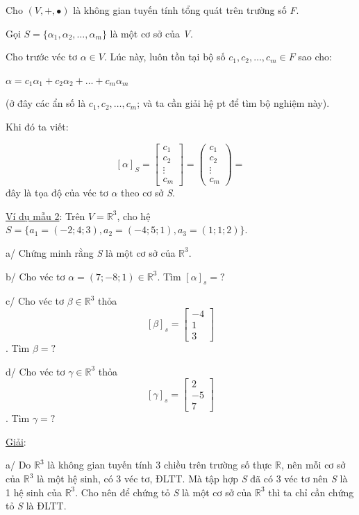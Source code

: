 \documentclass[12pt,a4paper]{article}
\newcommand{\ul}[1]{\uline{#1}}
\begin{document}
Cho $(V, +, \bullet)$ là không gian
tuyến tính tổng quát trên trường số \emph{F}.

Gọi $S = \{ \alpha_1, \alpha_2, \dots, \alpha_m \}$ là một cơ sở của
\emph{V}.

Cho trước véc tơ $\alpha \in V$. Lúc
này, luôn tồn tại bộ số
$c_1, c_2, \dots, c_m \in F$ sao cho:

$\alpha = c_1\alpha_1 + c_2\alpha_2 + \dots + c_m\alpha_m$

(ở đây các ẩn số là $c_1, c_2, \dots, c_m$;
và ta cần giải hệ pt để tìm bộ nghiệm này).

Khi đó ta viết:

\[[\alpha]_S = \begin{bmatrix} c_1 \\ c_2 \\ \vdots \\ c_m \end{bmatrix} = \begin{pmatrix} c_1 \\ c_2 \\ \vdots \\ c_m \end{pmatrix} =\] đây là tọa độ của véc
tơ $\alpha$ theo cơ sở
\emph{S}.

\ul{Ví dụ mẫu 2}: Trên
$V = \mathbb{R}^3$, cho hệ
$S = \{ a_1 = (-2; 4; 3), a_2 = (-4; 5; 1), a_3 = (1; 1; 2) \}$.

a/ Chứng minh rằng \emph{S} là một cơ sở của
$\mathbb{R}^3$.

b/ Cho véc tơ $\alpha = (7; -8; 1) \in \mathbb{R}^3$. Tìm
$[\alpha]_s =?$

c/ Cho véc tơ $\beta \in \mathbb{R}^3$ thỏa
\[[\beta]_s = \begin{bmatrix} -4 \\ 1 \\ 3 \end{bmatrix}\]. Tìm
$\beta =?$

d/ Cho véc tơ $\gamma \in \mathbb{R}^3$ thỏa
\[[\gamma]_s = \begin{bmatrix} 2 \\ -5 \\ 7 \end{bmatrix}\]. Tìm
$\gamma =?$

\ul{Giải}:

a/ Do $\mathbb{R}^3$ là không gian
tuyến tính 3 chiều trên trường số thực
$\mathbb{R}$, nên mỗi cơ sở của
$\mathbb{R}^3$ là một hệ sinh, có 3
véc tơ, ĐLTT. Mà tập hợp \emph{S} đã có 3 véc tơ nên \emph{S} là 1 hệ
sinh của $\mathbb{R}^3$. Cho nên để
chứng tỏ \emph{S} là một cơ sở của
$\mathbb{R}^3$ thì ta chỉ cần chứng
tỏ \emph{S} là ĐLTT.
\end{document}
